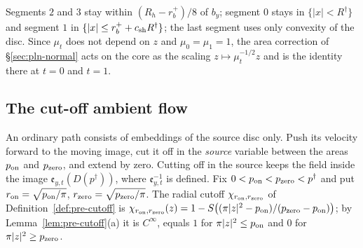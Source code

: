 Segments $2$ and $3$ stay within $(R_h-r_b^+)/8$ of $b_y$; segment $0$ stays in $\{|x|<R^\dagger\}$ and segment $1$
in $\{|x|\le r_b^++c_{\rm sh}R^\dagger\}$; the last segment uses only convexity of the disc. Since $\mu_t$ does not depend on
$z$ and $\mu_0=\mu_1=1$, the area correction of \S\ref{sec:pln-normal} acts on the core as the scaling
$z\mapsto\mu_t^{-1/2}z$ and is the identity there at $t=0$ and $t=1$.

\subsection{The cut-off ambient flow}\label{sec:pln-flow}

An ordinary path consists of embeddings of the source disc only. Push its velocity forward to the moving image,
cut it off in the \emph{source} variable between the areas $p_{\rm on}$ and $p_{\rm zero}$, and extend by zero. Cutting off in
the source keeps the field inside the image $\mathfrak e_{y,t}(D(p^\dagger))$, where $\mathfrak e_{y,t}^{-1}$ is defined. Fix
$0<p_{\rm on}<p_{\rm zero}<p^\dagger$ and put $r_{\rm on}=\sqrt{p_{\rm on}/\pi}$, $r_{\rm zero}=\sqrt{p_{\rm zero}/\pi}$. The radial
cutoff $\chi_{r_{\rm on},r_{\rm zero}}$ of Definition~\ref{def:pre-cutoff} is
$\chi_{r_{\rm on},r_{\rm zero}}(z)=1-S\bigl((\pi|z|^2-p_{\rm on})/(p_{\rm zero}-p_{\rm on})\bigr)$; by Lemma~\ref{lem:pre-cutoff}(a) it is
$C^\infty$, equals $1$ for $\pi|z|^2\le p_{\rm on}$ and $0$ for $\pi|z|^2\ge p_{\rm zero}$.

